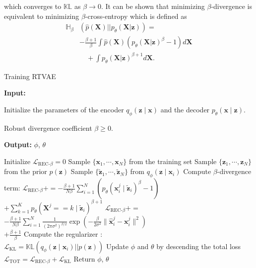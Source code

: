 \documentclass{article}
\def\bx{\mathbf{x}}
\def\bX{\mathbf{X}}
\def\bz{\mathbf{z}}
\theoremstyle{plain}
\theoremstyle{definition}
\begin{document}
which converges to $\mathbb{KL}$ as $\beta \rightarrow 0$.  It can be shown that minimizing $\beta$-divergence is equivalent to minimizing $\beta$-cross-entropy \cite{eguchi2010entropy, futami2017variational} which is defined as
\begin{equation}
\begin{split}
\mathbb{H}_{\beta} & (\hat{p}(\bX) || p_{\theta}(\bX | \bz)) = \\
& - \frac{\beta + 1}{\beta} \int \hat{p}(\bX) \left(p_{\theta}(\bX | \bz)^{\beta}-1 \right) d \bX  \\ 
& \quad + \int p_{\theta}(\bX| \bz)^{\beta + 1} d \bX.
\end{split}
\label{eqn:beta_entropy}
\end{equation}

\begin{algorithm}[!b]
   \caption{Training RTVAE}
   
   \textbf{Input:} 
   
	\hspace{\parindent} Initialize the parameters of the encoder $q_{\phi}(\bz \mid \bx)$ and the decoder $p_{\theta}(\bx \mid \bz)$.
		
	\hspace{\parindent} Robust divergence coefficient $\beta \geq 0$.

   \textbf{Output:} 
	\hspace{\parindent} $\phi$, $\theta$

\begin{algorithmic}[1]
      \STATE Initialize $\mathcal{L}_{\textrm{REC-}\beta}=0 $
   \STATE Sample $\{\bx_1, \cdots, \bx_N \}$ from the training set
   \STATE Sample $\{\bz_1, \cdots, \bz_N \}$ from the prior $p(\bz)$
   \STATE Sample $\{\tilde{\bz}_1, \cdots, \tilde{\bz}_N \}$ from $q_{\phi}(\bz \mid \bx_i)$
   \STATE Compute $\beta$-divergence term: 
   \STATE $\mathcal{L}_{\textrm{REC-}\beta} += - \frac{\beta+1}{N \beta} \sum_{i=1}^N \left( p_{\theta}(\bx_i^j \mid \tilde{\bz}_i)^{\beta} - 1 \right)$ \\  \quad \quad  \quad \quad \quad $+ \sum_{k=1}^K p_{\theta}(\bX^j == k \mid \tilde{\bz}_i)^{\beta+1}$
   \STATE $\mathcal{L}_{\textrm{REC-}\beta} +=$ \\
    \quad $- \frac{\beta+1}{N \beta} \sum_{i=1}^N \frac{1}{(2 \pi \sigma^2)^{\beta/2}} \exp \left( - \frac{\beta}{2 \sigma^2} \| \hat{\bx}_i^j - \bx_i^j \|^2 \right)$ \\ \quad $+\frac{\beta + 1}{\beta}$
   \ENDIF
   \ENDFOR
   \STATE Compute the regularizer : \\\quad $\mathcal{L}_{\textrm{KL}} = \mathbb{KL}({q_{\phi}(\bz \mid \bx_i) || p(\bz)}) $
   \STATE Update $\phi$ and $\theta$ by descending the total loss \\\quad $\mathcal{L}_{\textrm{TOT}} = \mathcal{L}_{\textrm{REC-}\beta} + \mathcal{L}_{\textrm{KL}} $
   \ENDWHILE
   \STATE Return $\phi$, $\theta$
\end{algorithmic}
\label{alg:rvae}
\end{algorithm}
\end{document}
